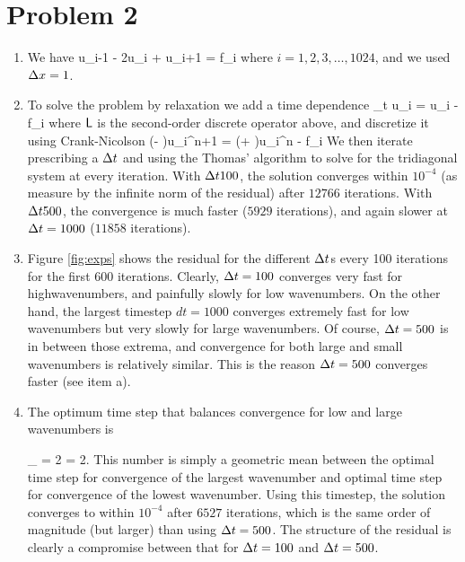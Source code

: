 \documentclass[11pt]{article}
\begin{document}
\section*{Problem 2}

    \begin{enumerate}
        
            \item We have
                \beq
                    u_{i-1} - 2u_{i} + u_{i+1} = f_i\com
                \eeq
                where $i=1, 2, 3, \ldots, 1024$, and we used $\Delta x = 1$. 

            \item To solve the problem by relaxation we add a time dependence
                \beq
                    \p_t u_i = \sL u_i - f_i\com
                \eeq
                where $\mathsf{L}$ is the second-order discrete operator above, and discretize it
                using Crank-Nicolson
                \beq
                \left(\sI - \sL\right)u_i^{n+1} = \left(\sI + \sL\right)u_i^{n} - \dt f_i\per
                \eeq
                We then iterate prescribing a $\Delta t$ and using the Thomas' algorithm to solve for the tridiagonal system
                at every iteration. With $\Delta t 100$, the solution converges within $10^{-4}$ (as measure by the infinite norm of the residual) after  $12766$ iterations. With $\Delta t 500$, the convergence is much faster ($5929$ iterations), and again slower at $\Delta t = 1000$ ($11858$ iterations).

            \item Figure \ref{fig:exps} shows the residual for the different $\Delta t$s every 100 iterations for the first
                 600 iterations. Clearly, $\Delta t=100$ converges very fast for highwavenumbers, and painfully slowly for
                 low wavenumbers. On the other hand, the largest timestep $dt=1000$ converges extremely fast for low wavenumbers but very slowly for large wavenumbers. Of course, $\Delta t=500$ is in between those extrema, and convergence for both large and small wavenumbers is relatively similar. This is the reason $\Delta t=500$ converges faster (see item a).

            \item The optimum time step that balances convergence for low and large wavenumbers is

                \beq
                \dt_{} = 2  \nmax = 2.
                \eeq
            This number is simply a geometric mean between the optimal time step for convergence of the  largest wavenumber and optimal time step for convergence of the lowest wavenumber. Using this timestep, the solution converges to within $10^{-4}$ after $6527$ iterations, which is the same order of magnitude (but larger) than using $\Delta t=500$. The structure of the residual is clearly a compromise between that for $\Delta t=100$ and $\Delta t=500$.


\end{enumerate}
\end{document}
